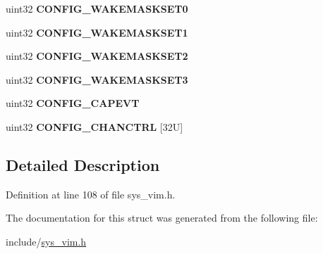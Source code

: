 \begin{DoxyCompactItemize}
\item 
\mbox{\label{structvim__config__reg_a07c5838b93ce6e5c17d6921d04873b7c}} 
uint32 {\bfseries C\+O\+N\+F\+I\+G\+\_\+\+W\+A\+K\+E\+M\+A\+S\+K\+S\+E\+T0}
\item 
\mbox{\label{structvim__config__reg_a3cb3bdd92029f737d7358e8fa844163f}} 
uint32 {\bfseries C\+O\+N\+F\+I\+G\+\_\+\+W\+A\+K\+E\+M\+A\+S\+K\+S\+E\+T1}
\item 
\mbox{\label{structvim__config__reg_a2c84c65b62ae3d39755bf9dc6a288e44}} 
uint32 {\bfseries C\+O\+N\+F\+I\+G\+\_\+\+W\+A\+K\+E\+M\+A\+S\+K\+S\+E\+T2}
\item 
\mbox{\label{structvim__config__reg_aa24a55fc5919f19efb3a1d5c91da5b28}} 
uint32 {\bfseries C\+O\+N\+F\+I\+G\+\_\+\+W\+A\+K\+E\+M\+A\+S\+K\+S\+E\+T3}
\item 
\mbox{\label{structvim__config__reg_a435dd514ad9880b5feb338d620b79ab5}} 
uint32 {\bfseries C\+O\+N\+F\+I\+G\+\_\+\+C\+A\+P\+E\+VT}
\item 
\mbox{\label{structvim__config__reg_a236bc0f22c9fc92e7539fcf2435a3ce3}} 
uint32 {\bfseries C\+O\+N\+F\+I\+G\+\_\+\+C\+H\+A\+N\+C\+T\+RL} \mbox{[}32\+U\mbox{]}
\end{DoxyCompactItemize}


\subsection{Detailed Description}


Definition at line 108 of file sys\+\_\+vim.\+h.



The documentation for this struct was generated from the following file\+:\begin{DoxyCompactItemize}
\item 
include/\mbox{\hyperlink{sys__vim_8h}{sys\+\_\+vim.\+h}}\end{DoxyCompactItemize}
